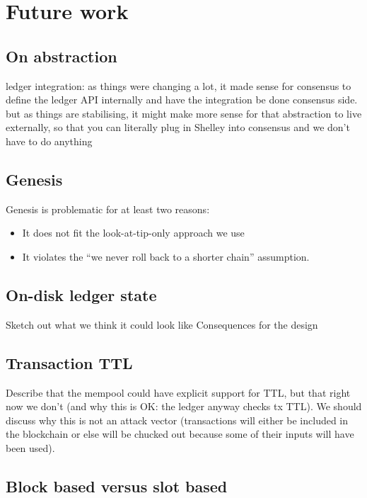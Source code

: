 \chapter{Future work}

\section{On abstraction}

ledger integration: as things were changing a lot, it made sense for consensus to define the ledger API internally and have the integration be done consensus side. but as things are stabilising, it might make more sense for that abstraction to live externally, so that you can literally plug in Shelley into consensus and we don't have to do anything

\section{Genesis}
\label{future:genesis}

Genesis is problematic for at least two reasons:

\begin{itemize}
\item It does not fit the look-at-tip-only approach we use
\item It violates the ``we never roll back to a shorter chain'' assumption.
\end{itemize}

\section{On-disk ledger state}

\duncan

Sketch out what we think it could look like
Consequences for the design

\section{Transaction TTL}
\label{future:ttl}

Describe that the mempool could have explicit support for TTL, but that right now we don't (and why this is OK: the ledger anyway checks tx TTL). We should discuss why this is not an attack vector (transactions will either be included in the blockchain or else will be chucked out because some of their inputs will have been used).

\section{Block based versus slot based}
\label{future:block-vs-slot}

